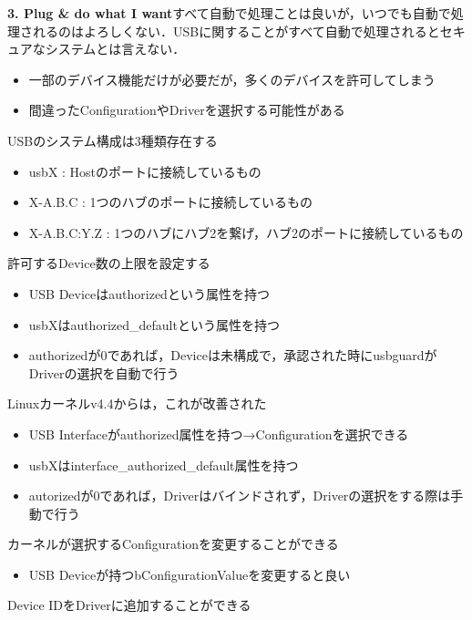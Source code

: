 \documentclass[10pt]{jreport}
\begin{document}
\begin{description}
          \item {\large \textbf{3. Plug \& do what I want}}\mbox\\
          すべて自動で処理ことは良いが，いつでも自動で処理されるのはよろしくない．USBに関することがすべて自動で処理されるとセキュアなシステムとは言えない．
          \begin{itemize}
            \item 一部のデバイス機能だけが必要だが，多くのデバイスを許可してしまう
            \item 間違ったConfigurationやDriverを選択する可能性がある
          \end{itemize}
          USBのシステム構成は3種類存在する
          \begin{itemize}
            \item usbX : Hostのポートに接続しているもの
            \item X-A.B.C : 1つのハブのポートに接続しているもの
            \item X-A.B.C:Y.Z : 1つのハブにハブ2を繋げ，ハブ2のポートに接続しているもの
          \end{itemize}
          許可するDevice数の上限を設定する
          \begin{itemize}
            \item USB Deviceはauthorizedという属性を持つ
            \item usbXはauthorized\_defaultという属性を持つ
            \item authorizedが0であれば，Deviceは未構成で，承認された時にusbguardがDriverの選択を自動で行う
          \end{itemize}
          Linuxカーネルv4.4からは，これが改善された
          \begin{itemize}
            \item USB Interfaceがauthorized属性を持つ→Configurationを選択できる
            \item usbXはinterface\_authorized\_default属性を持つ
            \item autorizedが0であれば，Driverはバインドされず，Driverの選択をする際は手動で行う
          \end{itemize}
          カーネルが選択するConfigurationを変更することができる
          \begin{itemize}
            \item USB Deviceが持つbConfigurationValueを変更すると良い
          \end{itemize}
          Device IDをDriverに追加することができる
          \begin{itemize}

\end{itemize}
\end{description}
\end{document}
